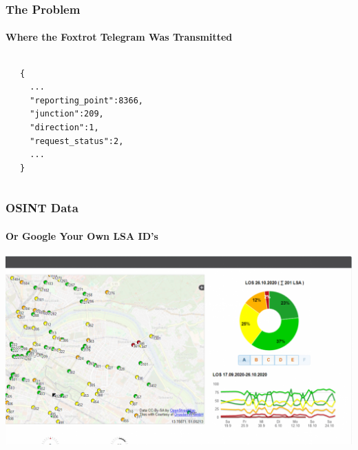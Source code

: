 







\begin{frame}[fragile]
  \frametitle{The Problem}
  \framesubtitle{Where the Foxtrot Telegram Was Transmitted}

  \begin{columns}

    \begin{itemize}
  \end{itemize}


  \begin{lstlisting}[basicstyle=\scriptsize]
{
  ...
  "reporting_point":8366,
  "junction":209,
  "direction":1,
  "request_status":2,
  ...
}
  \end{lstlisting}

\end{columns}

\end{frame}

\begin{frame}
  \frametitle{OSINT Data}
  \framesubtitle{Or Google Your Own LSA ID's}
  \centering
  \includegraphics[width=.8\textwidth]{./figs/urbic-osint.png}
\end{frame}


